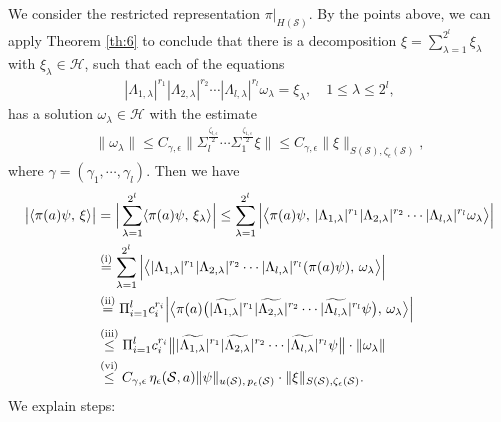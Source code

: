\documentclass[11 pt]{amsart}
\newcommand{\norm}[1]{\lVert#1\rVert}
\theoremstyle{definition}
\numberwithin{equation}{section}
\begin{document}
We consider the restricted representation $\pi|_{H(\mathcal{S})}$. By the points above, we can apply
 Theorem \ref{th:6} to conclude that there is a decomposition $\xi=\sum_{\lambda=1}^{2^l}\xi_\lambda$ with $\xi_\lambda\in \mathcal{H}$, such that each of the equations
\begin{align*}
|\Lambda_{1,\lambda}|^{r_1}|\Lambda_{2,\lambda}|^{r_2}\cdots |\Lambda_{l,\lambda}|^{r_l}\omega_\lambda=\xi_\lambda, \quad 1\leq \lambda\leq 2^l,
\end{align*}
has a solution $\omega_\lambda\in \mathcal{H}$ with the estimate
\begin{align}\label{for:135}
\norm{\omega_\lambda} \leq C_{\gamma,\epsilon} \big\|\Sigma_l^{\frac{\zeta_{l,\epsilon}}{2}}\cdots \Sigma_1^{\frac{\zeta_{1,\epsilon}}{2}}\xi\big\|\leq C_{\gamma,\epsilon} \norm{\xi}_{S(\mathcal{S}),\zeta_{\epsilon}(\mathcal{S})},
\end{align}
where $\gamma=(\gamma_1,\cdots, \gamma_l)$. Then we have
\begin{align}\label{for:166}
 \big|\langle \pi(a)\psi, \,\xi\rangle\big|&=\Big|\sum_{\lambda=1}^{2^l}\langle \pi(a)\psi, \,\xi_\lambda\rangle\Big|\leq\sum_{\lambda=1}^{2^l}\Big|\big\langle \pi(a)\psi, \, |\Lambda_{1,\lambda}|^{r_1}|\Lambda_{2,\lambda}|^{r_2}\cdots |\Lambda_{l,\lambda}|^{r_l}\omega_\lambda\big\rangle\Big|\notag\\
 &\overset{\text{(i)}}{=}\sum_{\lambda=1}^{2^l}\Big|\big\langle |\Lambda_{1,\lambda}|^{r_1}|\Lambda_{2,\lambda}|^{r_2}\cdots |\Lambda_{l,\lambda}|^{r_l}(\pi(a)\psi), \, \omega_\lambda\big\rangle\Big|\notag\\
 &\overset{\text{(ii)}}{=}\Pi_{i=1}^l c_i^{r_i}\Big|\big\langle \pi(a)\big(|\widetilde{\Lambda_{1,\lambda}}|^{r_1}|\widetilde{\Lambda_{2,\lambda}}|^{r_2}\cdots |\widetilde{\Lambda_{l,\lambda}}|^{r_l}\psi\big), \, \omega_\lambda\big\rangle\Big|\notag\\
 &\overset{\text{(iii)}}{\leq} \Pi_{i=1}^l c_i^{r_i}\big\|  |\widetilde{\Lambda_{1,\lambda}}|^{r_1}|\widetilde{\Lambda_{2,\lambda}}|^{r_2}\cdots |\widetilde{\Lambda_{l,\lambda}}|^{r_l}\psi \big\|\cdot \norm{\omega_\lambda}\notag\\
 &\overset{\text{(vi)}}{\leq} C_{\gamma,\epsilon} \,\eta_\epsilon(\mathcal{S}, a)\|\psi\|_{u(\mathcal{S}),\,p_{\epsilon}(\mathcal{S})} \cdot \norm{\xi}_{S(\mathcal{S}),\zeta_{\epsilon}(\mathcal{S})}.
\end{align}
We explain steps:
\end{document}
